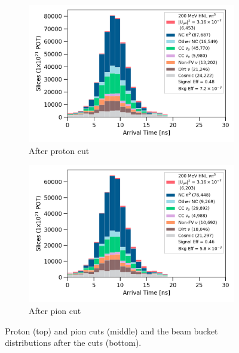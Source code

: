 \begin{figure}[ht!]
\begin{subfigure}[b]{0.495\textwidth}
            \includegraphics[width=\textwidth]{beam_bucket_postproton}
            \caption{After proton cut}%
            \label{fig:bb_post_proton}
        \end{subfigure}
        \hfill
        \begin{subfigure}[b]{0.495\textwidth}   
            \centering 
            \includegraphics[width=\textwidth]{beam_bucket_postpion}
            \caption{After pion cut}%
            \label{fig:bb_post_pion}
        \end{subfigure}
        \caption{
		Proton (top) and pion cuts (middle) and the beam bucket distributions after the cuts (bottom). 
	}
        \label{fig:razzled_proton_cut}
\end{figure}
